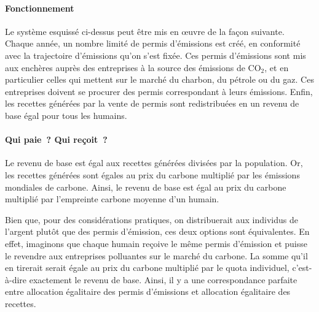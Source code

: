\documentclass[a5paper,french,openany]{memoir}
\begin{document}
\paragraph{Fonctionnement}
Le système esquissé ci-dessus peut être mis en œuvre de la façon suivante. Chaque année, un nombre limité de permis d'émissions est créé, en conformité avec la trajectoire d'émissions qu'on s'est fixée. Ces permis d'émissions sont mis aux enchères auprès des entreprises à la source des émissions de CO$_\text{2}$, et en particulier celles qui mettent sur le marché du charbon, du pétrole ou du gaz. Ces entreprises doivent se procurer des permis correspondant à leurs émissions. Enfin, les recettes générées par la vente de permis sont redistribuées en un revenu de base égal pour tous les humains. 

\paragraph{Qui paie~? Qui reçoit~?}
Le revenu de base est égal aux recettes générées divisées par la population. Or, les recettes générées sont égales au prix du carbone multiplié par les émissions mondiales de carbone. Ainsi, le revenu de base est égal au prix du carbone multiplié par l'empreinte carbone moyenne d'un humain. 

Bien que, pour des considérations pratiques, on distribuerait aux individus de l'argent plutôt que des permis d'émission, ces deux options sont équivalentes. En effet, imaginons que chaque humain reçoive le même permis d'émission et puisse le revendre aux entreprises polluantes sur le marché du carbone. La somme qu'il en tirerait serait égale au prix du carbone multiplié par le quota individuel, c'est-à-dire exactement le revenu de base. Ainsi, il y a une correspondance parfaite entre allocation égalitaire des permis d'émissions et allocation égalitaire des recettes. %
\end{document}
